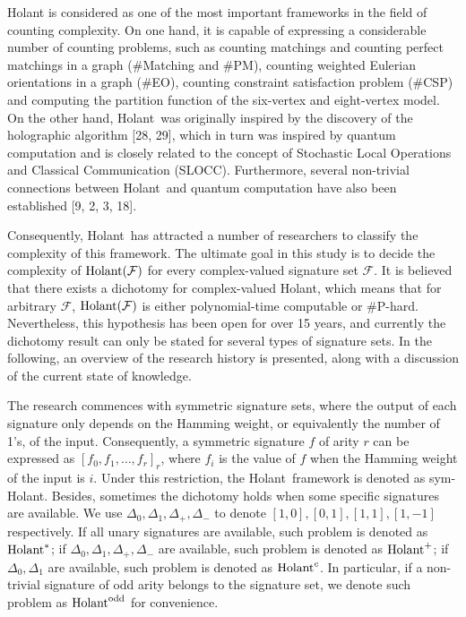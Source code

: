 Holant is considered as one of the most important frameworks in the field of counting complexity. On one hand, it is capable of expressing a considerable number of counting problems, such as counting matchings and counting perfect matchings in a graph (\#Matching and \#PM), counting weighted Eulerian orientations in a graph (\#EO), counting constraint satisfaction problem (\#CSP) and computing the partition function of the six-vertex and eight-vertex model. On the other hand, Holant was originally inspired by the discovery of the holographic algorithm [28, 29], which in turn was inspired by quantum computation and is closely related to the concept of Stochastic Local Operations and Classical Communication (SLOCC). Furthermore, several non-trivial connections between Holant and quantum computation have also been established [9, 2, 3, 18].\par




Consequently, Holant has attracted a number of researchers to classify the complexity of this framework. The ultimate goal in this study is to decide the complexity of $\textup{{Holant}}(\mathcal{F})$ for every complex-valued signature set $\mathcal{F}$. It is believed that there exists a dichotomy for complex-valued Holant, which means that for arbitrary $\mathcal{F}$, $\textup{{Holant}}(\mathcal{F})$ is either polynomial-time computable or \#P-hard. Nevertheless, this hypothesis has been open for over 15 years, and currently the dichotomy result can only be stated for several types of signature sets. In the following, an overview of the research history is presented, along with a discussion of the current state of knowledge.\par




The research commences with symmetric signature sets, where the output of each signature only depends on the Hamming weight, or equivalently the number of 1’s, of the input. Consequently, a symmetric signature $f$ of arity $r$ can be expressed as $[f_{0},f_{1},\ldots,f_{r}]_{r}$, where $f_{i}$ is the value of $f$ when the Hamming weight of the input is $i$. Under this restriction, the Holant framework is denoted as sym-Holant. Besides, sometimes the dichotomy holds when some specific signatures are available.
We use $\Delta_{0},\Delta_{1},\Delta_{+},\Delta_{-}$ to denote $[1,0],[0,1],[1,1],[1,-1]$ respectively. If all unary signatures are available, such problem is denoted as $\textup{{Holant}}^{*}$; if $\Delta_{0},\Delta_{1},\Delta_{+},\Delta_{-}$ are available, such problem is denoted as $\textup{{Holant}}^{+}$; if $\Delta_{0},\Delta_{1}$ are available, such problem is denoted as $\textup{{Holant}}^{c}$. In particular, if a non-trivial signature of odd arity belongs to the signature set, we denote such problem as $\textup{{Holant}}^{\text{odd}}$ for convenience.\par




